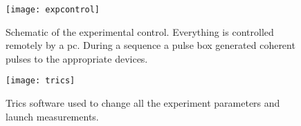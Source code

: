 \begin{figure}
\centering
\texttt{[image: expcontrol]}
\caption{Schematic of the experimental control. Everything is controlled remotely by a pc. During a sequence a pulse box generated coherent pulses to the appropriate devices.}
\label{expcontrol}
\end{figure}

\begin{figure}
\centering
\texttt{[image: trics]}
\caption{Trics software used to change all the experiment parameters and launch measurements.}
\label{trics}
\end{figure}
